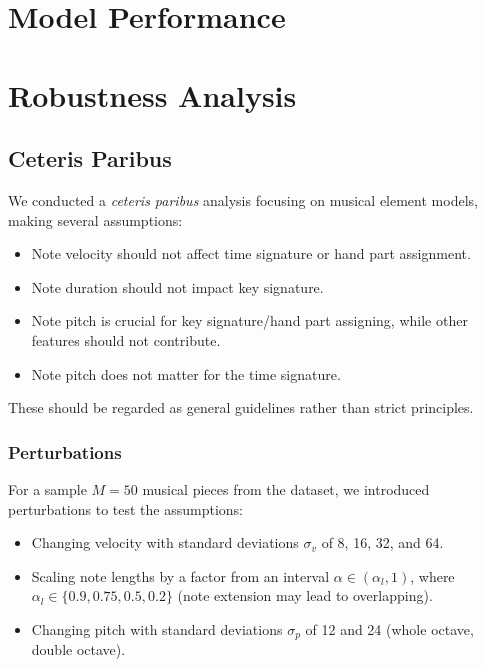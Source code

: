 \section{Model Performance}

\section{Robustness Analysis}

\subsection{Ceteris Paribus}

We conducted a \emph{ceteris paribus} analysis focusing on musical element models, making several assumptions:

\begin{itemize}[noitemsep, topsep=4pt]
	\item Note velocity should not affect time signature or hand part assignment.
	\item Note duration should not impact key signature.
	\item Note pitch is crucial for key signature/hand part assigning, while other features should not contribute.
	\item Note pitch does not matter for the time signature.
\end{itemize}

These should be regarded as general guidelines rather than strict principles.

\subsubsection{Perturbations}

For a sample $M=50$ musical pieces from the dataset, we introduced perturbations to test the assumptions:

\begin{itemize}[noitemsep, topsep=4pt]
	\item Changing velocity with standard deviations $\sigma_v$ of 8, 16, 32, and 64.
	\item Scaling note lengths by a factor from an interval $\alpha\in(\alpha_l,1)$, where $\alpha_l\in\{0.9, 0.75, 0.5, 0.2\}$ (note extension may lead to overlapping).
	\item Changing pitch with standard deviations $\sigma_p$ of 12 and 24 (whole octave, double octave).
\end{itemize}

